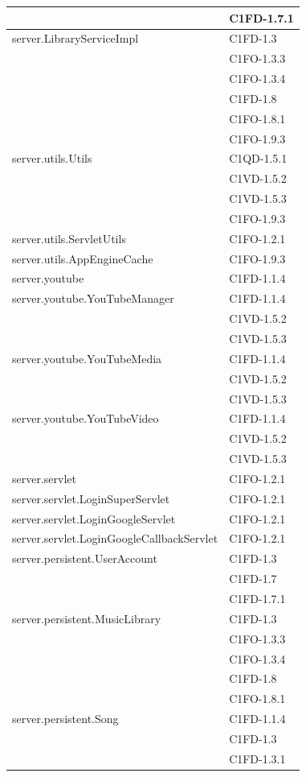 \begin{footnotesize}
\begin{longtable}[!h]{|l|l|}
& C1FD-1.7.1\\\hline 
server.LibraryServiceImpl  &  C1FD-1.3\\
& C1FO-1.3.3\\
& C1FO-1.3.4\\
& C1FD-1.8\\
& C1FO-1.8.1\\
& C1FO-1.9.3\\\hline  
server.utils.Utils  & C1QD-1.5.1\\
& C1VD-1.5.2\\
& C1VD-1.5.3\\
& C1FO-1.9.3\\\hline 
server.utils.ServletUtils  &  C1FO-1.2.1 \\\hline  
server.utils.AppEngineCache  &  C1FO-1.9.3\\\hline
server.youtube  &  C1FD-1.1.4 \\\hline
server.youtube.YouTubeManager  &  C1FD-1.1.4 \\
& C1VD-1.5.2\\
& C1VD-1.5.3\\\hline
server.youtube.YouTubeMedia  &  C1FD-1.1.4 \\
& C1VD-1.5.2\\
& C1VD-1.5.3\\\hline
server.youtube.YouTubeVideo  &  C1FD-1.1.4 \\
& C1VD-1.5.2\\
& C1VD-1.5.3\\\hline
server.servlet  &  C1FO-1.2.1 \\\hline 
server.servlet.LoginSuperServlet  &  C1FO-1.2.1 \\\hline 
server.servlet.LoginGoogleServlet  &  C1FO-1.2.1 \\\hline 
server.servlet.LoginGoogleCallbackServlet  &  C1FO-1.2.1 \\\hline  
server.persistent.UserAccount  &  C1FD-1.3\\
& C1FD-1.7\\
& C1FD-1.7.1\\\hline 
server.persistent.MusicLibrary  &  C1FD-1.3 \\
& C1FO-1.3.3\\
& C1FO-1.3.4\\
& C1FD-1.8\\
& C1FO-1.8.1\\\hline 
server.persistent.Song  & C1FD-1.1.4 \\
& C1FD-1.3\\
& C1FD-1.3.1\\

\end{longtable}
\end{footnotesize}
